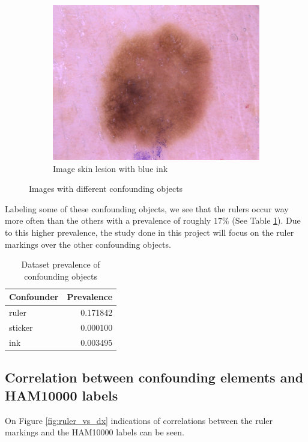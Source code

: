 \begin{figure}[ht]
\begin{center}
\begin{subfigure}[b]{0.3\textwidth}
            \includegraphics[width=\textwidth]{./images/ISIC_0027514.jpg}
            \caption{Image skin lesion with blue ink}
        \end{subfigure}
    \end{center}
    \caption{Images with different confounding objects}
    \label{fig:confounding_objects}
\end{figure}

Labeling some of these confounding objects, we see that the rulers occur way more often than the others with a prevalence of roughly $17\%$ (See Table \ref{table:confounding_objects}).
Due to this higher prevalence, the study done in this project will focus on the ruler markings over the other confounding objects.

\begin{table}
    \centering
    \begin{tabular}{|l|r|}
        \hline 
        Confounder &  Prevalence \\ \hline
        ruler   &  0.171842 \\ \hline
        sticker &  0.000100 \\ \hline
        ink     &  0.003495 \\ \hline
    \end{tabular}
    \caption{Dataset prevalence of confounding objects}
    \label{table:confounding_objects}
\end{table}

\subsection{Correlation between confounding elements and HAM10000 labels}
On Figure \ref{fig:ruler_vs_dx} indications of correlations between the ruler markings and the HAM10000 labels can be seen.

